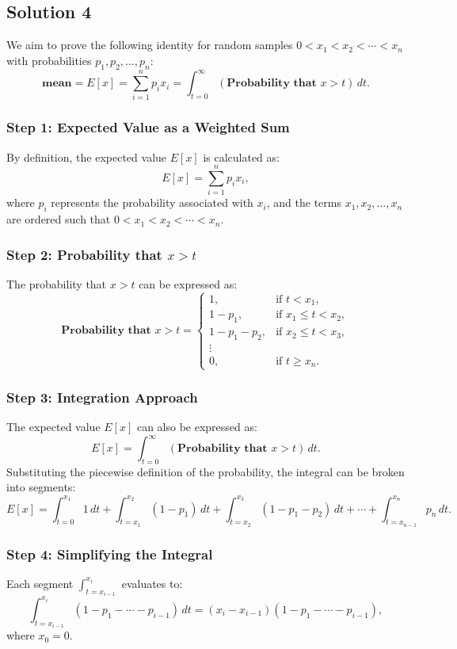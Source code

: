 \documentclass[12pt]{article}
\begin{document}
\subsection*{Solution 4}

We aim to prove the following identity for random samples \( 0 < x_1 < x_2 < \cdots < x_n \) with probabilities \( p_1, p_2, \dots, p_n \):
\[
\textbf{mean} = E[x] = \sum_{i=1}^{n} p_i x_i = \int_{t=0}^\infty (\textbf{Probability that } x > t) \, dt.
\]

\subsubsection*{Step 1: Expected Value as a Weighted Sum}
By definition, the expected value \( E[x] \) is calculated as:
\[
E[x] = \sum_{i=1}^n p_i x_i,
\]
where \( p_i \) represents the probability associated with \( x_i \), and the terms \( x_1, x_2, \dots, x_n \) are ordered such that \( 0 < x_1 < x_2 < \cdots < x_n \).

\subsubsection*{Step 2: Probability that \( x > t \)}
The probability that \( x > t \) can be expressed as:
\[
\textbf{Probability that } x > t = 
\begin{cases} 
1, & \text{if } t < x_1, \\
1 - p_1, & \text{if } x_1 \leq t < x_2, \\
1 - p_1 - p_2, & \text{if } x_2 \leq t < x_3, \\
\vdots \\
0, & \text{if } t \geq x_n.
\end{cases}
\]

\subsubsection*{Step 3: Integration Approach}
The expected value \( E[x] \) can also be expressed as:
\[
E[x] = \int_{t=0}^\infty (\textbf{Probability that } x > t) \, dt.
\]
Substituting the piecewise definition of the probability, the integral can be broken into segments:
\[
E[x] = \int_{t=0}^{x_1} 1 \, dt 
+ \int_{t=x_1}^{x_2} (1 - p_1) \, dt 
+ \int_{t=x_2}^{x_3} (1 - p_1 - p_2) \, dt 
+ \cdots 
+ \int_{t=x_{n-1}}^{x_n} p_n \, dt.
\]

\subsubsection*{Step 4: Simplifying the Integral}
Each segment \( \int_{t=x_{i-1}}^{x_i} \) evaluates to:
\[
\int_{t=x_{i-1}}^{x_i} (1 - p_1 - \cdots - p_{i-1}) \, dt 
= (x_i - x_{i-1})(1 - p_1 - \cdots - p_{i-1}),
\]
where \( x_0 = 0 \).
\end{document}
